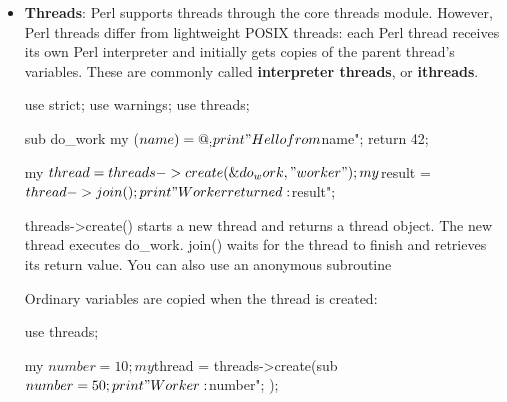 \documentclass{report}
\begin{document}
    \pagebreak 
    \begin{itemize}
        \item \textbf{Threads}: Perl supports threads through the core threads module. However, Perl threads differ from lightweight POSIX threads: each Perl thread receives its own Perl interpreter and initially gets copies of the parent thread’s variables.
            \bigbreak \noindent 
            These are commonly called \textbf{interpreter threads}, or \textbf{ithreads}.
            \bigbreak \noindent 
            \begin{perlcode}
                use strict;
                use warnings;
                use threads;

                sub do_work {
                    my ($name) = @_;

                    print "Hello from $name\n";
                    return 42;
                }

                my $thread = threads->create(\&do_work, "worker");

                my $result = $thread->join();

                print "Worker returned: $result\n";
            \end{perlcode}
            \bigbreak \noindent 
            threads->create() starts a new thread and returns a thread object. The new thread executes do_work.
            \bigbreak \noindent 
            join() waits for the thread to finish and retrieves its return value.
            \bigbreak \noindent 
            You can also use an anonymous subroutine
            \bigbreak \noindent 
            \bigbreak \noindent 
            Ordinary variables are copied when the thread is created:
            \bigbreak \noindent 
            \begin{perlcode}
                use threads;

                my $number = 10;

                my $thread = threads->create(sub {
                    $number = 50;
                    print "Worker: $number\n";
                });


\end{perlcode}
\end{itemize}
\end{document}
